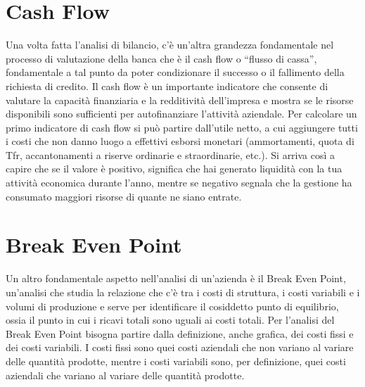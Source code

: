 
\section{Cash Flow}


Una volta fatta l’analisi di bilancio, c’è un’altra grandezza fondamentale nel processo di valutazione della banca che è il cash flow o “flusso di cassa”, fondamentale a tal punto da poter condizionare il successo o il fallimento della richiesta di credito. Il cash flow è un importante indicatore che consente di valutare la capacità finanziaria e la redditività dell'impresa e mostra se le risorse disponibili sono sufficienti per autofinanziare l'attività aziendale.
Per calcolare un primo indicatore di cash flow si può partire dall’utile netto, a cui aggiungere tutti i costi che non danno luogo a effettivi esborsi monetari (ammortamenti, quota di Tfr, accantonamenti a riserve ordinarie e straordinarie, etc.). Si arriva così a capire che se il valore è positivo, significa che hai generato liquidità con la tua attività economica durante l’anno, mentre se negativo segnala che la gestione ha consumato maggiori risorse di quante ne siano entrate.


\section{Break Even Point}

Un altro fondamentale aspetto nell'analisi di un'azienda è il Break Even Point, un’analisi che studia la relazione che c’è tra i costi di struttura, i costi variabili e i volumi di produzione e serve per identificare il cosiddetto punto di equilibrio, ossia il punto in cui i ricavi totali sono uguali ai costi totali. Per l’analisi del Break Even Point bisogna partire dalla definizione, anche grafica, dei costi fissi e dei costi variabili. I costi fissi sono quei costi aziendali che non variano al variare delle quantità prodotte, mentre i costi variabili  sono, per definizione,  quei costi aziendali che variano al variare delle quantità prodotte.
